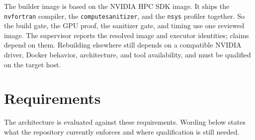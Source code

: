\documentclass[11pt]{article}
\newcommand{\code}[1]{\texttt{#1}}
\begin{document}
The builder image is based on the NVIDIA HPC SDK image. It ships
the \code{nvfortran} compiler, the \code{compute\-sanitizer}, and the
\code{nsys} profiler together. So the build gate, the GPU proof, the sanitizer
gate, and timing use one reviewed image. The supervisor reports the resolved
image and executor identities; claims depend on them. Rebuilding elsewhere still
depends on a compatible NVIDIA driver, Docker behavior, architecture, and tool
availability, and must be qualified on the target host.

\section{Requirements}

The architecture is evaluated against these requirements. Wording below states
what the repository currently enforces and where qualification is still needed.
\end{document}
